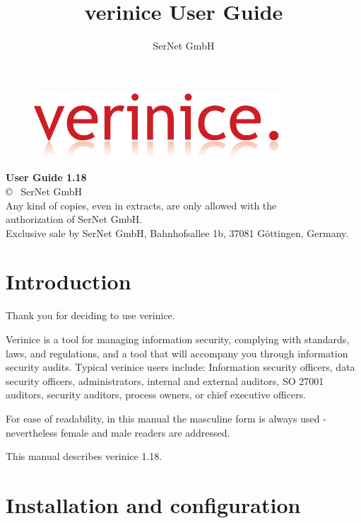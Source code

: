 \documentclass[a4paper,10pt]{book}
\title{verinice User Guide \vnversion{}}
\author{SerNet GmbH}
\newcommand*{\vnversion}{1.18}
\begin{document}

\begin{titlepage}
    \centering
    \vspace{1cm}
    \begin{figure}[htb!]
      \centering
      \colorbox{white}{\includegraphics{Image/logo.pdf}}
    \end{figure}
    \huge\textbf{User Guide \vnversion{}}\\
    \vspace{14cm}
    \normalsize
  \copyright{} \the\year\ SerNet GmbH\\
  Any kind of copies, even in extracts, are only allowed with the\\
  authorization of SerNet GmbH.\\
  Exclusive sale by SerNet GmbH, Bahnhofsallee 1b, 37081 Göttingen, Germany.
\end{titlepage}

\tableofcontents

\listoftables

\listoffigures

\chapter{Introduction}
Thank you for deciding to use verinice.

Verinice is a tool for managing information security, complying with standards,
laws, and regulations, and a tool that will accompany you through information
security audits. Typical verinice users include: Information security officers,
data security officers, administrators, internal and external auditors,
SO 27001 auditors, security auditors, process owners, or chief executive
officers.

For ease of readability, in this manual the masculine form is always used -
nevertheless female and male readers are addressed.

This manual describes verinice \vnversion{}.

\newpage
\chapter{Installation and configuration}
\end{document}
